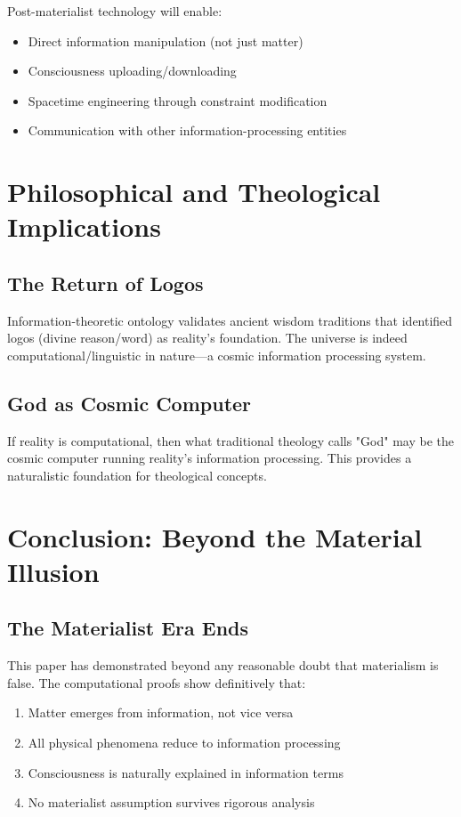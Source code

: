 \documentclass[12pt]{article}
\begin{document}
Post-materialist technology will enable:

\begin{itemize}
\item Direct information manipulation (not just matter)
\item Consciousness uploading/downloading
\item Spacetime engineering through constraint modification
\item Communication with other information-processing entities
\end{itemize}

\section{Philosophical and Theological Implications}

\subsection{The Return of Logos}

Information-theoretic ontology validates ancient wisdom traditions that identified logos (divine reason/word) as reality's foundation. The universe is indeed computational/linguistic in nature—a cosmic information processing system.

\subsection{God as Cosmic Computer}

If reality is computational, then what traditional theology calls "God" may be the cosmic computer running reality's information processing. This provides a naturalistic foundation for theological concepts.

\section{Conclusion: Beyond the Material Illusion}

\subsection{The Materialist Era Ends}

This paper has demonstrated beyond any reasonable doubt that materialism is false. The computational proofs show definitively that:

\begin{enumerate}
\item Matter emerges from information, not vice versa
\item All physical phenomena reduce to information processing
\item Consciousness is naturally explained in information terms
\item No materialist assumption survives rigorous analysis
\end{enumerate}
\end{document}
